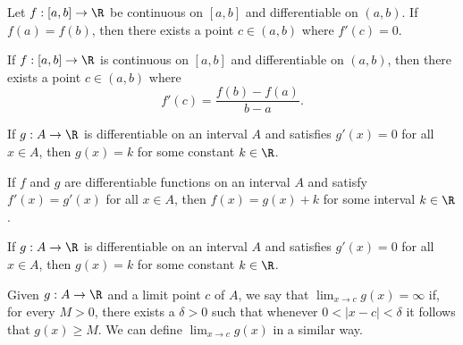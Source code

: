 \begin{tcolorbox}
    \begin{thm}
        Let \( f : [a,b] \to \R  \) be continuous on \( [a,b]  \) and differentiable on \( (a,b)  \). If \( f(a) = f(b) \), then there exists a point \( c \in (a,b)  \) where \( f'(c) = 0  \). 
    \end{thm}
\end{tcolorbox}

\begin{tcolorbox}
    \begin{thm}
        If \( f: [a,b] \to \R  \) is continuous on \( [a,b]  \) and differentiable on \( (a,b)  \), then there exists a point \( c \in (a,b)  \) where 
        \[  f'(c) = \frac{ f(b) - f(a)  }{ b - a  }. \]
    \end{thm}
\end{tcolorbox}

\begin{tcolorbox}
\begin{cor}
If \( g: A \to \R  \) is differentiable on an interval \( A  \) and satisfies \( g'(x) = 0  \) for all \( x \in A  \), then \( g(x) = k  \) for some constant \(  k \in \R  \).
\end{cor}
\end{tcolorbox}

\begin{tcolorbox}
\begin{cor}
If \( f  \) and \( g  \) are differentiable functions on an interval \( A  \) and satisfy \( f'(x) = g'(x)   \) for all \( x \in A  \), then \( f(x) = g(x) + k  \) for some interval \(  k \in \R  \).
\end{cor}
\end{tcolorbox}

\begin{tcolorbox}
\begin{cor}
If \( g: A \to \R  \) is differentiable on an interval \( A  \) and satisfies \( g'(x) = 0  \) for all \( x \in A  \), then \( g(x) = k  \) for some constant \(  k \in \R  \).
\end{cor}
\end{tcolorbox}

\begin{tcolorbox}
\begin{defn}
Given \( g: A \to \R \) and a limit point \( c  \) of \( A  \), we say that \( \lim_{ x \to c  } g(x) = \infty  \) if, for every \( M > 0  \), there exists a \( \delta > 0  \) such that whenever \( 0 < | x -c  |  < \delta  \) it follows that \( g(x) \geq M  \). We can define \( \lim_{ x \to c  } g(x)  \) in a similar way.
\end{defn}
\end{tcolorbox}


